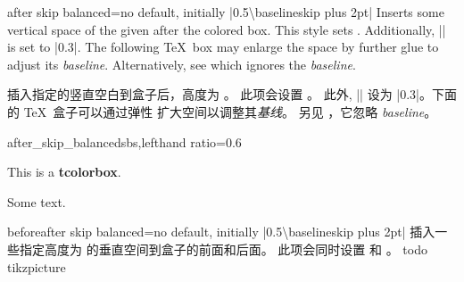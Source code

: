 \begin{docTcbKey}[][doc new={2020-09-25}]{after skip balanced}{=}{no default, initially |0.5\textbackslash baselineskip plus 2pt|}
Inserts some vertical space of the given  after the colored box.
This style sets .
Additionally, |\prevdepth| is set to |0.3\baselineskip|. The following
\TeX\ box may enlarge the space by further glue to adjust its \emph{baseline}.
Alternatively, see  which ignores the \emph{baseline}.

插入指定的竖直空白到盒子后，高度为 。%
此项会设置 。%
此外, |\prevdepth| 设为 |0.3\baselineskip|。下面的 \TeX\ 盒子可以通过弹性%
扩大空间以调整其\emph{基线}。%
另见 ，它忽略 \emph{baseline}。

\begin{exdispExample*}{after_skip_balanced}{sbs,lefthand ratio=0.6}
\begin{tcolorbox}[after skip balanced=1cm,
colframe=red!50!white]
This is a \textbf{tcolorbox}.
\end{tcolorbox}
Some text.
\end{exdispExample*}
\end{docTcbKey}



\begin{docTcbKey}[][doc new={2020-09-25}]{beforeafter skip balanced}{=}{no default, initially |0.5\textbackslash baselineskip plus 2pt|}
插入一些指定高度为  的垂直空间到盒子的前面和后面。
此项会同时设置  和 。
todo tikzpicture
\end{docTcbKey}



